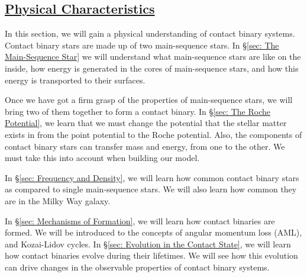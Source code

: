 \documentclass[12pt]{article} %
\numberwithin{equation}{section} %
\begin{document}



\subsection[Physical Characteristics]{\hyperlink{toc}{Physical Characteristics}}


In this section, we will gain a physical understanding of contact binary systems. Contact binary stars are made up of two main-sequence stars. In \S \ref{sec: The Main-Sequence Star} we will understand what main-sequence stars are like on the inside, how energy is generated in the cores of main-sequence stars, and how this energy is transported to their surfaces.

Once we have got a firm grasp of the properties of main-sequence stars, we will bring two of them together to form a contact binary. In \S \ref{sec: The Roche Potential}, we learn that we must change the potential that the stellar matter exists in from the point potential to the Roche potential. Also, the components of contact binary stars can transfer mass and energy, from one to the other. We must take this into account when building our model.

In \S \ref{sec: Frequency and Density}, we will learn how common contact binary stars as compared to single main-sequence stars. We will also learn how common they are in the Milky Way galaxy.

In \S \ref{sec: Mechanisms of Formation}, we will learn how contact binaries are formed. We will be introduced to the concepts of angular momentum loss (AML), and Kozai-Lidov cycles. In \S \ref{sec: Evolution in the Contact State}, we will learn how contact binaries evolve during their lifetimes. We will see how this evolution can drive changes in the observable properties of contact binary systems.
\end{document}

